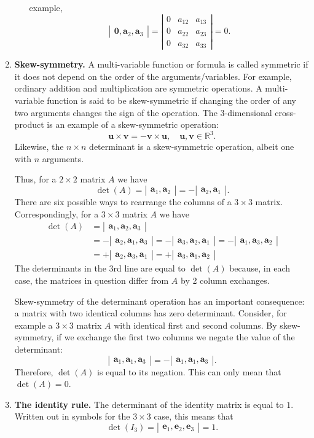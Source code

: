 \documentclass[12pt]{article}
\newcommand{\bzero}{\boldsymbol{0}}
\newcommand{\ba}{\mathbf{a}}
\newcommand{\be}{\mathbf{e}}
\newcommand{\bu}{\mathbf{u}}
\newcommand{\bv}{\mathbf{v}}
\newcommand{\R}{\mathbb{R}}
\newcommand{\vmat}[1]{\left|\begin{matrix}#1\end{matrix}\right|}
\begin{document}
\begin{enumerate}
\begin{enumerate}
    example,
    \[ \vmat{\bzero, \ba_2, \ba_3} = \vmat{0 & a_{12} & a_{13} \\ 0 & a_{22} & a_{23} \\ 0 & a_{32}
      & a_{33}} = 0.\]
  \end{enumerate}
\item \textbf{Skew-symmetry.}  A multi-variable function or formula is
  called symmetric if it does not depend on the order of the
  arguments/variables.  For example, ordinary addition and
  multiplication are symmetric operations.  A multi-variable function
  is said to be skew-symmetric if changing the order of any two
  arguments changes the sign of the operation.  The 3-dimensional
  cross-product is an example of a skew-symmetric operation:
  \[ \bu \times \bv = - \bv\times \bu,\quad \bu,\bv \in \R^3.\]
  Likewise, the $n\times n$ determinant is a skew-symmetric operation,
  albeit one with $n$ arguments.

  Thus, for a $2\times 2$ matrix $A$ we have
  \[ \det(A) = \vmat{\ba_1, \ba_2} = - \vmat{\ba_2, \ba_1}.\] There
  are six possible ways to rearrange the columns of a $3\times 3$
  matrix.  Correspondingly, for a $3\times 3$ matrix $A$ we have
  \begin{align*}
    \det(A) &= \vmat{\ba_1, \ba_2, \ba_3}\\
    &=-\vmat{\ba_2, \ba_1, \ba_3} = -\vmat{\ba_3, \ba_2,
      \ba_1} = -\vmat{\ba_1, \ba_3, \ba_2} \\
    &= +\vmat{\ba_2, \ba_3,
      \ba_1} = +\vmat{\ba_3, \ba_1, \ba_2} 
  \end{align*}
  The determinants in the 3rd line are equal to $\det(A)$ because, in
  each case, the matrices in question differ from $A$ by 2 column
  exchanges.

  Skew-symmetry of the determinant operation has an important consequence: a
  matrix with two identical columns has zero determinant.  Consider,
  for example a $3\times 3$ matrix $A$ with identical first and second
  columns.  By skew-symmetry, if we exchange the first two columns we
  negate the value of the determinant:
  \[ \vmat{\ba_1, \ba_1, \ba_3} = - \vmat{\ba_1,\ba_1, \ba_3}.\]
  Therefore, $\det(A)$ is equal to its negation.  This can only mean
  that $\det(A) = 0$.
\item \textbf{The identity  rule.} The determinant of the identity
  matrix is equal to $1$.  Written out in symbols for the
  $3\times 3$ case, this means that
  \[ \det(I_3) = \vmat{\be_1, \be_2, \be_3} = 1.\]
\end{enumerate}
\end{document}
